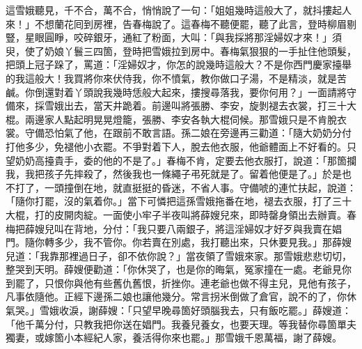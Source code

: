 這雪娥聽見，千不合，萬不合，悄悄說了一句：「姐姐幾時這般大了，就抖摟起人來！」{}不想蘭花囘到房裡，告春梅說了。這春梅不聽便罷，聽了此言，登時柳眉剔豎，星眼圓睜，咬碎銀牙，通紅了粉面，大叫：「與我採將那淫婦奴才來！」須臾，使了奶娘丫鬟三四箇，登時把雪娥拉到房中。春梅氣狠狠的一手扯住他頭髮，把頭上冠子跺了，罵道：「淫婦奴才，你怎的說幾時這般大？不是你西門慶家擡舉的我這般大！我買將你來伏侍我，你不憤氣，教你做口子湯，不是精淡，就是苦鹹。你倒還對着丫頭說我幾時恁般大起來，摟搜尋落我，要你何用？」一面請將守備來，採雪娥出去，當天井跪着。前邊叫將張勝、李安，旋剝褪去衣裳，打三十大棍。兩邊家人點起明晃晃燈籠，張勝、李安各執大棍伺候。那雪娥只是不肯脫衣裳。守備恐怕氣了他，在跟前不敢言語。孫二娘在旁邊再三勸道：「隨大奶奶分付打他多少，免褪他小衣罷。不爭對着下人，脫去他衣服，他爺體面上不好看的。只望奶奶高擡貴手，委的他的不是了。」春梅不肯，定要去他衣服打，說道：「那箇攔我，我把孩子先摔殺了，然後我也一條繩子弔死就是了。留着他便是了。」{}於是也不打了，一頭撞倒在地，就直挺挺的昏迷，不省人事。守備唬的連忙扶起，說道：「隨你打罷，沒的氣着你。」當下可憐把這孫雪娥拖番在地，褪去衣服，打了三十大棍，打的皮開肉綻。一面使小牢子半夜叫將薛嫂兒來，即時罄身領出去辦賣。春梅把薛嫂兒叫在背地，分付：「我只要八兩銀子，將這淫婦奴才好歹與我賣在娼門。隨你轉多少，我不管你。你若賣在別處，我打聽出來，只休要見我。」那薛嫂兒道：「我靠那裡過日子，卻不依你說？」當夜領了雪娥來家。那雪娥悲悲切切，整哭到天明。薛嫂便勸道：「你休哭了，也是你的晦氣，冤家撞在一處。{}老爺見你到罷了，只恨你與他有些舊仇舊恨，折挫你。連老爺也做不得主兒，見他有孩子，凡事依隨他。正經下邊孫二娘也讓他幾分。常言拐米倒做了倉官，說不的了，你休氣哭。」雪娥收淚，謝薛嫂：「只望早晚尋箇好頭腦我去，只有飯吃罷。」薛嫂道：「他千萬分付，只教我把你送在娼門。我養兒養女，也要天理。等我替你尋箇單夫獨妻，或嫁箇小本經紀人家，養活得你來也罷。」那雪娥千恩萬福，謝了薛嫂。

